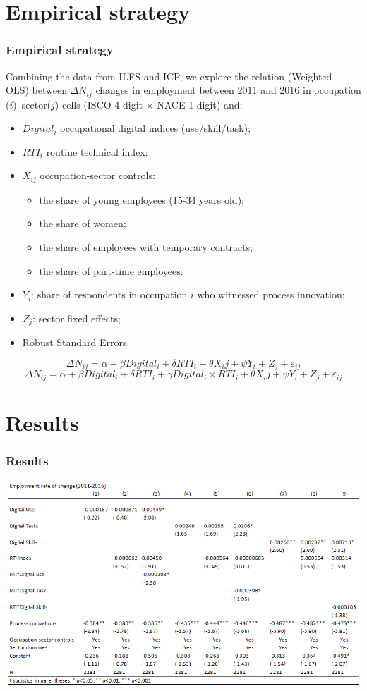 \documentclass[10pt,xcolor={usenames,dvipsnames}]{beamer}
\begin{document}
\section{Empirical strategy}

\begin{frame} 
\frametitle{Empirical strategy}

Combining the data from ILFS and ICP, we explore the relation (Weighted - OLS) between $\Delta N_{ij}$ changes in employment between 2011 and 2016 in occupation ($i$)--sector($j$) cells (ISCO 4-digit $\times$ NACE 1-digit) and:
\begin{itemize}
    \item $Digital_i$ occupational digital indices (use/skill/task);
    \item $RTI_i$ routine technical index:
    \item $X_{ij}$ occupation-sector controls:
    \begin{itemize}
        \item  the share of young employees (15-34 years old);
        \item the share of women; 
        \item the share of employees with temporary contracts;
        \item the share of part-time employees. 
    \end{itemize}
    \item $Y_i$: share of respondents in occupation $i$ who witnessed process innovation;
    \item $Z_j$: sector fixed effects;
    \item Robust Standard Errors.
\end{itemize}

\[\Delta N_{ij} = \alpha + \beta Digital_i + \delta RTI_i + \theta X_ij + \psi Y_i + Z_j + \varepsilon_{ij}\]
\[\Delta N_{ij} = \alpha + \beta Digital_i + \delta RTI_i + \gamma Digital_i \times RTI_i + \theta X_ij + \psi Y_i + Z_j + \varepsilon_{ij}\]
\end{frame}

\section{Results}
\begin{frame} 
\frametitle{Results}
\centering
\includegraphics[width=\linewidth,height=0.8\textheight,keepaspectratio]{Figures/Results.png}
\end{frame}
\end{document}
